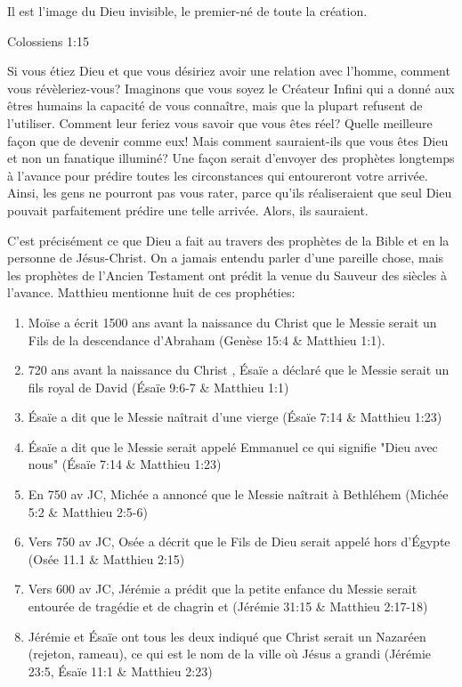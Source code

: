 
\epigraph{Il est l’image du Dieu invisible, le premier-né de toute la création.}{Colossiens 1:15}

Si vous étiez Dieu et que vous désiriez avoir une relation avec l'homme, comment vous révèleriez-vous? Imaginons que vous soyez le Créateur Infini qui a donné aux êtres humains la capacité de vous connaître, mais que la plupart refusent de l'utiliser. Comment leur feriez vous savoir que vous êtes réel? Quelle meilleure façon que de devenir comme eux! Mais comment sauraient-ils que vous êtes Dieu et non un fanatique illuminé? Une façon serait d'envoyer des prophètes longtemps à l'avance pour prédire toutes les circonstances qui entoureront votre arrivée. Ainsi, les gens ne pourront pas vous rater, parce qu'ils réaliseraient que seul Dieu pouvait parfaitement prédire une telle arrivée. Alors, ils sauraient.

C'est précisément ce que Dieu a fait au travers des prophètes de la Bible et en la personne de Jésus-Christ. On a jamais entendu parler d'une pareille chose, mais les prophètes de l'Ancien Testament ont prédit la venue du Sauveur des siècles à l'avance. Matthieu mentionne huit de ces prophéties:

\begin{enumerate}
\item Moïse a écrit 1500 ans avant la naissance du Christ que le Messie serait un Fils de la descendance d'Abraham (Genèse 15:4 \& Matthieu 1:1).
\item 720 ans avant la naissance du Christ , Ésaïe a déclaré que le Messie serait un fils royal de David (Ésaïe 9:6-7 \& Matthieu 1:1)
\item Ésaïe a dit que le Messie naîtrait d'une vierge (Ésaïe 7:14 \& Matthieu 1:23)
\item Ésaïe a dit que le Messie serait appelé Emmanuel ce qui signifie "Dieu avec nous" (Ésaïe 7:14 \& Matthieu 1:23)
\item En 750 av JC, Michée a annoncé que le Messie naîtrait à Bethléhem (Michée 5:2 \& Matthieu 2:5-6)
\item Vers 750 av JC, Osée a décrit que le Fils de Dieu serait appelé hors d'Égypte (Osée 11.1 \& Matthieu 2:15)
\item Vers 600 av JC, Jérémie a prédit que la petite enfance du Messie serait entourée de tragédie et de chagrin et (Jérémie 31:15 \& Matthieu 2:17-18)
\item Jérémie et Ésaïe ont tous les deux indiqué que Christ serait un Nazaréen (rejeton, rameau), ce qui est le nom de la ville où Jésus a grandi (Jérémie 23:5, Ésaïe 11:1 \& Matthieu 2:23)
\end{enumerate}

